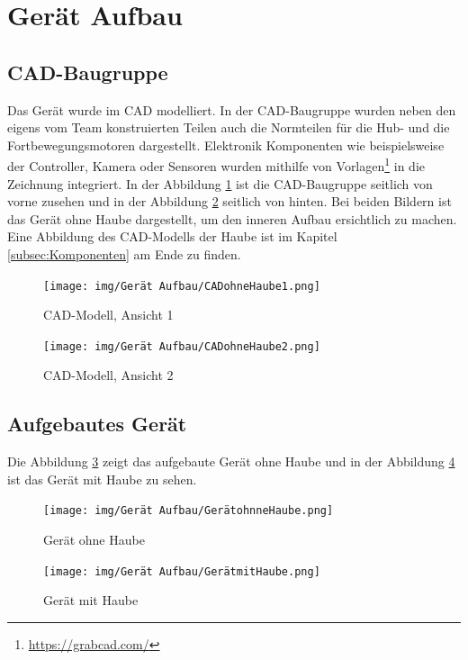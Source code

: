 \section{Gerät Aufbau}

\subsection{CAD-Baugruppe}

Das Gerät wurde im CAD modelliert. In der CAD-Baugruppe wurden neben den eigens vom Team konstruierten Teilen auch die Normteilen für die Hub- und die Fortbewegungsmotoren dargestellt. Elektronik Komponenten wie beispielsweise der Controller, Kamera oder Sensoren wurden mithilfe von Vorlagen\footnote{\url{https://grabcad.com/}} in die Zeichnung integriert. In der Abbildung \ref{fig:CADohneHaube1} ist die CAD-Baugruppe seitlich von vorne zusehen und in der Abbildung \ref{fig:CADohneHaube2} seitlich von hinten. Bei beiden Bildern ist das Gerät ohne Haube dargestellt, um den inneren Aufbau ersichtlich zu machen. Eine Abbildung des CAD-Modells der Haube ist im Kapitel \ref{subsec:Komponenten} am Ende zu finden.

\begin{figure}[H]
  \texttt{[image: img/Gerät Aufbau/CADohneHaube1.png]}
  \centering
  \caption{CAD-Modell, Ansicht 1}
  \label{fig:CADohneHaube1}
\end{figure}

\begin{figure}[H]
  \texttt{[image: img/Gerät Aufbau/CADohneHaube2.png]}
  \centering
  \caption{CAD-Modell, Ansicht 2}
  \label{fig:CADohneHaube2}
\end{figure}

\newpage

\subsection{Aufgebautes Gerät}

Die Abbildung \ref{fig:GerätohneHaube} zeigt das aufgebaute Gerät ohne Haube und in der Abbildung \ref{fig:GerätmitHaube} ist das Gerät mit Haube zu sehen. 

\begin{figure}[H]
  \texttt{[image: img/Gerät Aufbau/GerätohnneHaube.png]}
  \centering
  \caption{Gerät ohne Haube}
  \label{fig:GerätohneHaube}
\end{figure}

\begin{figure}[H]
  \texttt{[image: img/Gerät Aufbau/GerätmitHaube.png]}
  \centering
  \caption{Gerät mit Haube}
  \label{fig:GerätmitHaube}
\end{figure}

